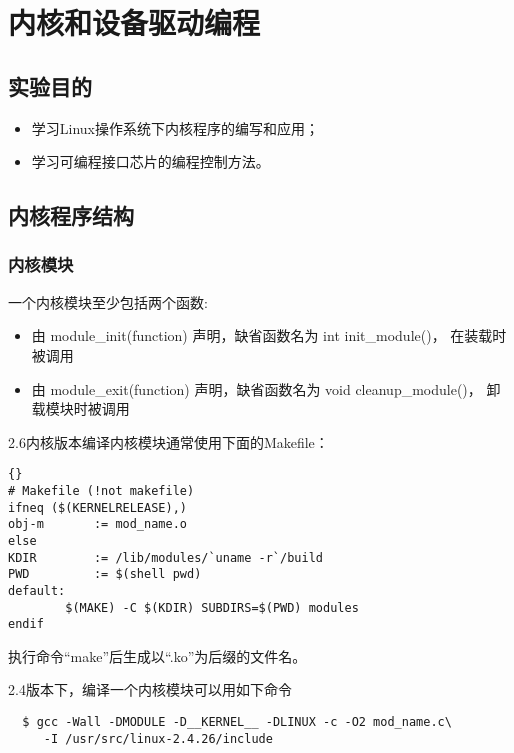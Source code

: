 \chapter{内核和设备驱动编程}

\section{实验目的}
\begin{itemize}\itemsep=-3pt
  \item 学习Linux操作系统下内核程序的编写和应用；
  \item 学习可编程接口芯片的编程控制方法。
\end{itemize}

\section{内核程序结构}
\subsection{内核模块}	
	一个内核模块至少包括两个函数:
\begin{itemize}\itemsep=-3pt
  \item 由 module\_init(function) 声明，缺省函数名为 int init\_module()，
		在装载时被调用
  \item 由 module\_exit(function) 声明，缺省函数名为 void cleanup\_module()，
		卸载模块时被调用
\end{itemize}

    2.6内核版本编译内核模块通常使用下面的Makefile：

\begin{boxedminipage}{.9\textwidth}
\lstset{language=make}
\begin{lstlisting}{}
# Makefile (!not makefile)
ifneq ($(KERNELRELEASE),)
obj-m       := mod_name.o
else
KDIR        := /lib/modules/`uname -r`/build
PWD         := $(shell pwd)
default:
        $(MAKE) -C $(KDIR) SUBDIRS=$(PWD) modules
endif
\end{lstlisting}
\end{boxedminipage}

执行命令``make''后生成以``.ko''为后缀的文件名。

	2.4版本下，编译一个内核模块可以用如下命令

\begin{boxedminipage}{.9\textwidth}
\begin{verbatim}
  $ gcc -Wall -DMODULE -D__KERNEL__ -DLINUX -c -O2 mod_name.c\
     -I /usr/src/linux-2.4.26/include
\end{verbatim}
\end{boxedminipage}

